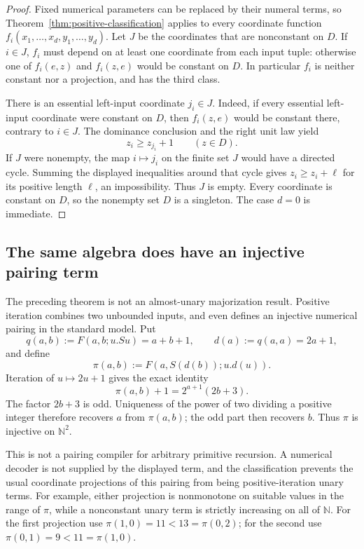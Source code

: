 \documentclass[11pt,letterpaper]{article}
\theoremstyle{definition}\newtheorem{definition}[theorem]{Definition}
\theoremstyle{remark}\newtheorem{remark}[theorem]{Remark}
\begin{document}
\begin{proof}
Fixed numerical parameters can be replaced by their numeral terms, so
Theorem~\ref{thm:positive-classification} applies to every coordinate
function $f_i(x_1,\ldots,x_d,y_1,\ldots,y_d)$.
Let $J$ be the coordinates that are nonconstant on $D$. If $i\in J$,
$f_i$ must depend on at least one coordinate from each input tuple:
otherwise one of $f_i(e,z)$ and $f_i(z,e)$ would be constant on $D$.
In particular $f_i$ is neither constant nor a projection, and has the
third class.

There is an essential left-input coordinate $j_i\in J$. Indeed, if
every essential left-input coordinate were constant on $D$, then
$f_i(z,e)$ would be constant there, contrary to $i\in J$.
The dominance conclusion and the right unit law yield
\[
                              z_i\geq z_{j_i}+1
                              \qquad(z\in D).
\]
If $J$ were nonempty, the map $i\mapsto j_i$ on the finite set $J$
would have a directed cycle. Summing the displayed inequalities around
that cycle gives $z_i\geq z_i+\ell$ for its positive length $\ell$,
an impossibility. Thus $J$ is empty. Every coordinate is constant on
$D$, so the nonempty set $D$ is a singleton. The case $d=0$ is immediate.
\end{proof}

\subsection{The same algebra does have an injective pairing term}

The preceding theorem is not an almost-unary majorization result.
Positive iteration combines two unbounded inputs, and even defines an
injective numerical pairing in the standard model.
Put
\[
 q(a,b):=F(a,b;u.Su)=a+b+1,\qquad
 d(a):=q(a,a)=2a+1,
\]
and define
\[
             \pi(a,b):=F(a,S(d(b));u.d(u)).
\]
Iteration of $u\mapsto2u+1$ gives the exact identity
\[
             \pi(a,b)+1=2^{a+1}(2b+3).
\]
The factor $2b+3$ is odd. Uniqueness of the power of two dividing a
positive integer therefore recovers $a$ from $\pi(a,b)$; the odd part
then recovers $b$. Thus $\pi$ is injective on $\mathbb N^2$.

This is not a pairing compiler for arbitrary primitive recursion. A
numerical decoder is not supplied by the displayed term, and the
classification prevents the usual coordinate projections of this pairing
from being positive-iteration unary terms. For example, either projection
is nonmonotone on suitable values in the range of $\pi$, while a
nonconstant unary term is strictly increasing on all of $\mathbb N$.
For the first projection use $\pi(1,0)=11<13=\pi(0,2)$;
for the second use $\pi(0,1)=9<11=\pi(1,0)$.
\end{document}
